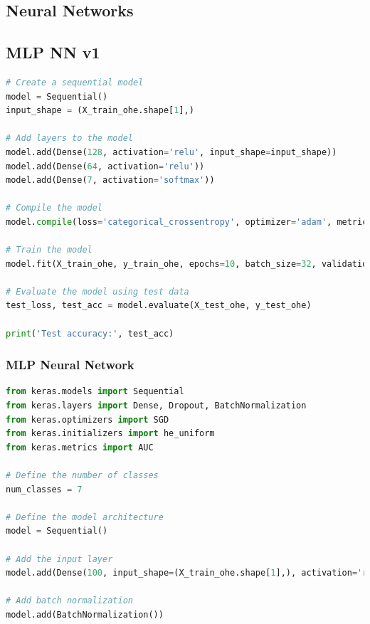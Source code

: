 \begin{appendices}
\newpage

\newpage



\section{Neural Networks}
\label{appx: Neural Networks}

\subsection{MLP NN v1}
\label{appx: MLP NN v1}

\begin{lstlisting}[language=Python]
# Create a sequential model
model = Sequential()
input_shape = (X_train_ohe.shape[1],)

# Add layers to the model
model.add(Dense(128, activation='relu', input_shape=input_shape))
model.add(Dense(64, activation='relu'))
model.add(Dense(7, activation='softmax'))

# Compile the model
model.compile(loss='categorical_crossentropy', optimizer='adam', metrics=['accuracy'])

# Train the model
model.fit(X_train_ohe, y_train_ohe, epochs=10, batch_size=32, validation_data=(X_test_ohe, y_test_ohe))

# Evaluate the model using test data
test_loss, test_acc = model.evaluate(X_test_ohe, y_test_ohe)

print('Test accuracy:', test_acc)
\end{lstlisting}

\subsubsection{MLP Neural Network}
\label{appx: MLP NN}

\begin{lstlisting}[language=Python]
from keras.models import Sequential
from keras.layers import Dense, Dropout, BatchNormalization
from keras.optimizers import SGD
from keras.initializers import he_uniform
from keras.metrics import AUC

# Define the number of classes
num_classes = 7

# Define the model architecture
model = Sequential()

# Add the input layer
model.add(Dense(100, input_shape=(X_train_ohe.shape[1],), activation='relu', kernel_initializer=he_uniform()))

# Add batch normalization
model.add(BatchNormalization())


\end{lstlisting}
\end{appendices}
